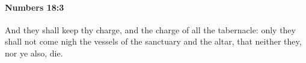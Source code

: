 
		\paragraph{Numbers 18:3} %
			\label{NUMBERS-18-3}

			And they shall keep thy charge, and the charge of all the tabernacle: only they shall not come nigh the vessels of the sanctuary and the altar, that neither they, nor ye also, die.


